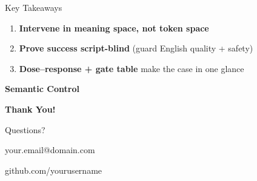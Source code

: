 \documentclass[aspectratio=169]{beamer}
\begin{document}
{

\begin{frame}{Key Takeaways}

\Large

\begin{enumerate}
  \item \textbf{Intervene in meaning space, not token space}

  \vspace{5mm}

  \item \textbf{Prove success script-blind} (guard English quality + safety)

  \vspace{5mm}

  \item \textbf{Dose–response + gate table} make the case in one glance
\end{enumerate}

\vspace{8mm}

\centering
\Large
\textbf{Semantic Control}

\end{frame}
}

{

\begin{frame}[plain]

\vspace{20mm}

\centering

\Huge \textbf{Thank You!}

\vspace{10mm}

\Large Questions?

\vspace{10mm}

\normalsize
your.email@domain.com

github.com/yourusername

\end{frame}
}
\end{document}

